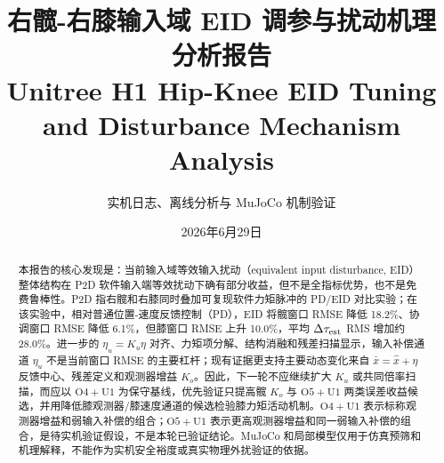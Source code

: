 \documentclass[12pt,a4paper]{ctexart}
\title{
    \vspace{2cm}
    \Huge \textbf{\color{mainblue}右髋-右膝输入域 EID 调参与扰动机理分析报告} \\[0.5em]
    \Large Unitree H1 Hip-Knee EID Tuning and Disturbance Mechanism Analysis
}
\author{
    \small 实机日志、离线分析与 MuJoCo 机制验证
}
\date{2026年6月29日}
\begin{document}
\maketitle
\thispagestyle{empty}

\vspace{1.2cm}

\begin{abstract}
本报告的核心发现是：当前输入域等效输入扰动（equivalent input disturbance, EID）整体结构在 P2D 软件输入端等效扰动下确有部分收益，但不是全指标优势，也不是免费鲁棒性。P2D 指右髋和右膝同时叠加可复现软件力矩脉冲的 PD/EID 对比实验；在该实验中，相对普通位置-速度反馈控制（PD），EID 将髋窗口 RMSE 降低 18.2\%、协调窗口 RMSE 降低 6.1\%，但膝窗口 RMSE 上升 10.0\%，平均 \(\Delta\tau_{\rm est}\) RMS 增加约 28.0\%。进一步的 \(\eta_u=K_u\eta\) 对齐、力矩项分解、结构消融和残差扫描显示，输入补偿通道 \(\eta_u\) 不是当前窗口 RMSE 的主要杠杆；现有证据更支持主要动态变化来自 \(\bar{x}=\hat{x}+\eta\) 反馈中心、残差定义和观测器增益 \(K_o\)。因此，下一轮不应继续扩大 \(K_u\) 或共同倍率扫描，而应以 \(\mathrm{O4+U1}\) 为保守基线，优先验证只提高髋 \(K_o\) 与 \(\mathrm{O5+U1}\) 两类误差收益候选，并用降低膝观测器/膝速度通道的候选检验膝力矩活动机制。\(\mathrm{O4+U1}\) 表示标称观测器增益和弱输入补偿的组合；\(\mathrm{O5+U1}\) 表示更高观测器增益和同一弱输入补偿的组合，是待实机验证假设，不是本轮已验证结论。MuJoCo 和局部模型仅用于仿真预筛和机理解释，不能作为实机安全裕度或真实物理外扰验证的依据。
\end{abstract}

\newpage
\tableofcontents
\newpage


\end{document}

